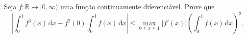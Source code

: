 Seja \(f \colon \mathbb{R} \to [0,\infty)\) uma função continuamente diferenciável. Prove que
\[
\left| \int_0^1 f^3 (x) \,\mathrm{d}x - f^2 (0) \int_0^1 f (x) \,\mathrm{d}x \right| \le \max_{0 \le x \le 1} |f'(x)| \left( \int_0^1 f (x) \,\mathrm{d}x \right)^2 .
\]
